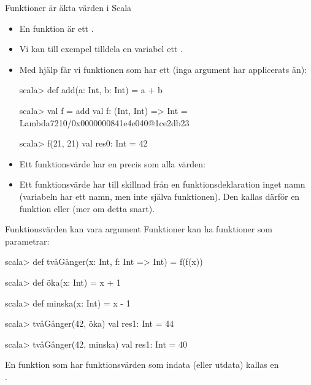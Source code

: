 
\begin{Slide}{Funktioner är äkta värden i Scala}\SlideFontSmall
\begin{itemize}
\item En funktion är ett .
\item Vi kan till exempel tilldela en variabel ett .
\pause
\item Med hjälp   får vi funktionen som har ett  (inga argument har applicerats än):
\begin{REPLnonum}
scala> def add(a: Int, b: Int) = a + b

scala> val f = add  
val f: (Int, Int) => Int = Lambda7210/0x0000000841e4e040@1ce2db23

scala> f(21, 21)
val res0: Int = 42
\end{REPLnonum}
\item Ett funktionsvärde har en  precis som alla värden: \\
\pause
\item Ett funktionsvärde har till skillnad från en funktionsdeklaration inget namn (variabeln  har ett namn, men inte själva funktionen). Den kallas därför en  funktion eller  (mer om detta snart).
\end{itemize}
\end{Slide}

\begin{Slide}{Funktionsvärden kan vara argument}\SlideFontSmall
Funktioner kan ha funktioner som parametrar:
\begin{REPL}
scala> def tvåGånger(x: Int, f: Int => Int) = f(f(x))

scala> def öka(x: Int) = x + 1

scala> def minska(x: Int) = x - 1

scala> tvåGånger(42, öka)
val res1: Int = 44

scala> tvåGånger(42, minska)
val res1: Int = 40
\end{REPL}
En funktion som har funktionsvärden som indata (eller utdata) kallas en\\   .

\end{Slide}



